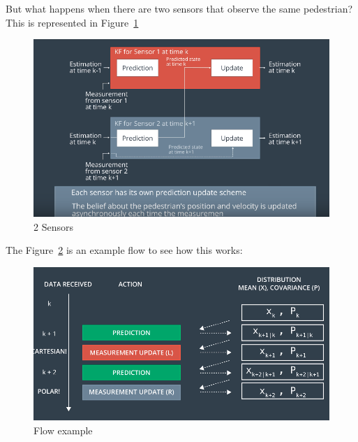 \documentclass[11pt, a4paper]{article}
\begin{document}
But what happens when there are two sensors that observe the same pedestrian? This is represented in Figure~\ref{fig:2-sensors}

\begin{figure}[htpb!]
	\centering
	\includegraphics[width=0.8\linewidth]{2-sensors}
	\caption{2 Sensors}
	\label{fig:2-sensors}
\end{figure}



The Figure~\ref{fig:example_flow} is an example flow to see how this works:


\begin{figure}[htpb!]
	\centering
	\includegraphics[width=0.8\linewidth]{example_flow}
	\caption{Flow example}
	\label{fig:example_flow}
\end{figure}
\end{document}
